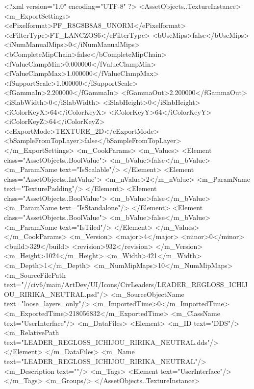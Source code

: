 <?xml version="1.0" encoding="UTF-8" ?>
<AssetObjects..TextureInstance>
	<m_ExportSettings>
		<ePixelformat>PF_R8G8B8A8_UNORM</ePixelformat>
		<eFilterType>FT_LANCZOS6</eFilterType>
		<bUseMips>false</bUseMips>
		<iNumManualMips>0</iNumManualMips>
		<bCompleteMipChain>false</bCompleteMipChain>
		<fValueClampMin>0.000000</fValueClampMin>
		<fValueClampMax>1.000000</fValueClampMax>
		<fSupportScale>1.000000</fSupportScale>
		<fGammaIn>2.200000</fGammaIn>
		<fGammaOut>2.200000</fGammaOut>
		<iSlabWidth>0</iSlabWidth>
		<iSlabHeight>0</iSlabHeight>
		<iColorKeyX>64</iColorKeyX>
		<iColorKeyY>64</iColorKeyY>
		<iColorKeyZ>64</iColorKeyZ>
		<eExportMode>TEXTURE_2D</eExportMode>
		<bSampleFromTopLayer>false</bSampleFromTopLayer>
	</m_ExportSettings>
	<m_CookParams>
		<m_Values>
			<Element class="AssetObjects..BoolValue">
				<m_bValue>false</m_bValue>
				<m_ParamName text="IsScalable"/>
			</Element>
			<Element class="AssetObjects..IntValue">
				<m_nValue>2</m_nValue>
				<m_ParamName text="TexturePadding"/>
			</Element>
			<Element class="AssetObjects..BoolValue">
				<m_bValue>false</m_bValue>
				<m_ParamName text="IsStandalone"/>
			</Element>
			<Element class="AssetObjects..BoolValue">
				<m_bValue>false</m_bValue>
				<m_ParamName text="IsTiled"/>
			</Element>
		</m_Values>
	</m_CookParams>
	<m_Version>
		<major>4</major>
		<minor>0</minor>
		<build>329</build>
		<revision>932</revision>
	</m_Version>
	<m_Height>1024</m_Height>
	<m_Width>421</m_Width>
	<m_Depth>1</m_Depth>
	<m_NumMipMaps>10</m_NumMipMaps>
	<m_SourceFilePath text="//civ6/main/ArtDev/UI/Icons/CivLeaders/LEADER_REGLOSS_ICHIJOU_RIRIKA_NEUTRAL.psd"/>
	<m_SourceObjectName text="loose_layers_only"/>
	<m_ImportedTime>0</m_ImportedTime>
	<m_ExportedTime>218056832</m_ExportedTime>
	<m_ClassName text="UserInterface"/>
	<m_DataFiles>
		<Element>
			<m_ID text="DDS"/>
			<m_RelativePath text="LEADER_REGLOSS_ICHIJOU_RIRIKA_NEUTRAL.dds"/>
		</Element>
	</m_DataFiles>
	<m_Name text="LEADER_REGLOSS_ICHIJOU_RIRIKA_NEUTRAL"/>
	<m_Description text=""/>
	<m_Tags>
		<Element text="UserInterface"/>
	</m_Tags>
	<m_Groups/>
</AssetObjects..TextureInstance>

